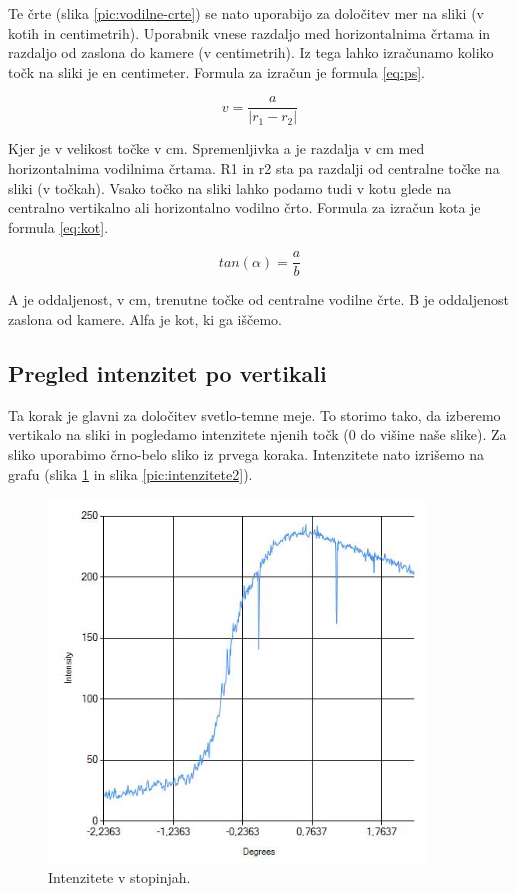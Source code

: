 \documentclass[oneside, a4paper, 12pt]{book}
\begin{document}
Te črte (slika \ref{pic:vodilne-crte}) se nato uporabijo za določitev mer na sliki (v kotih in centimetrih). Uporabnik vnese razdaljo med horizontalnima črtama in razdaljo od zaslona do kamere (v centimetrih). Iz tega lahko izračunamo koliko točk na sliki je en centimeter. Formula za izračun je formula \ref{eq:ps}.

\begin{equation}
v=\dfrac{a}{|r_1-r_2|}
\label{eq:ps}
\end{equation}


Kjer je v velikost točke v cm. Spremenljivka a je razdalja v cm med horizontalnima vodilnima črtama. R1 in r2 sta pa razdalji od centralne točke na sliki (v točkah).
Vsako točko na sliki lahko podamo tudi v kotu glede na centralno vertikalno ali horizontalno vodilno črto. Formula za izračun kota je formula \ref{eq:kot}.

\begin{equation}
tan(\alpha)=\dfrac{a}{b}
\label{eq:kot}
\end{equation}

A je oddaljenost, v cm, trenutne točke od centralne vodilne črte. B je oddaljenost zaslona od kamere. Alfa je kot, ki ga iščemo.

\subsection{Pregled intenzitet po vertikali}
Ta korak je glavni za določitev svetlo-temne meje. To storimo tako, da izberemo vertikalo na sliki in pogledamo intenzitete njenih točk (0 do višine naše slike). Za sliko uporabimo črno-belo sliko iz prvega koraka. Intenzitete nato izrišemo na grafu (slika \ref{pic:intenzitete1} in slika \ref{pic:intenzitete2}).

\begin{figure}
\begin{center}
\includegraphics[width=10cm]{slike/intenzitete.jpg}
\end{center}
\caption{Intenzitete v stopinjah.}
\label{pic:intenzitete1}
\end{figure}
\end{document}
